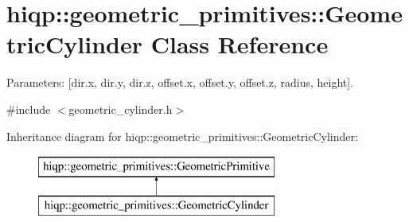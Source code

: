 \hypertarget{classhiqp_1_1geometric__primitives_1_1GeometricCylinder}{\section{hiqp\-:\-:geometric\-\_\-primitives\-:\-:Geometric\-Cylinder Class Reference}
\label{classhiqp_1_1geometric__primitives_1_1GeometricCylinder}
}


Parameters\-: \mbox{[}dir.\-x, dir.\-y, dir.\-z, offset.\-x, offset.\-y, offset.\-z, radius, height\mbox{]}.  




{\ttfamily \#include $<$geometric\-\_\-cylinder.\-h$>$}

Inheritance diagram for hiqp\-:\-:geometric\-\_\-primitives\-:\-:Geometric\-Cylinder\-:\begin{figure}[H]
\begin{center}
\leavevmode
\includegraphics[height=2.000000cm]{classhiqp_1_1geometric__primitives_1_1GeometricCylinder}
\end{center}
\end{figure}
